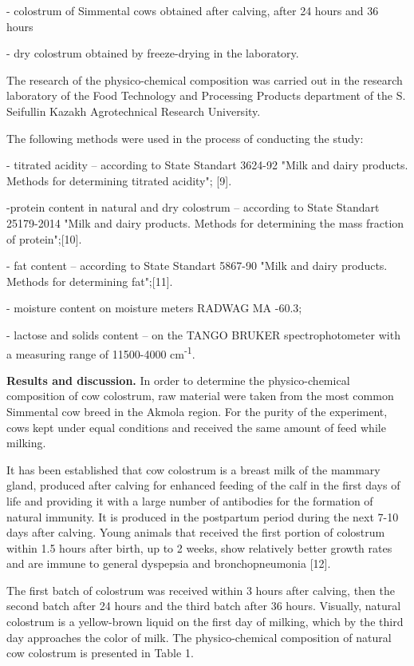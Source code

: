 - colostrum of Simmental cows obtained after calving, after 24 hours and
36 hours

- dry colostrum obtained by freeze-drying in the laboratory.

The research of the physico-chemical composition was carried out in the
research laboratory of the Food Technology and Processing Products
department of the S. Seifullin Kazakh Agrotechnical Research University.

The following methods were used in the process of conducting the study:

- titrated acidity -- according to State Standart 3624-92 "Milk and
dairy products. Methods for determining titrated acidity"; {[}9{]}.

-protein content in natural and dry colostrum -- according to State
Standart 25179-2014 "Milk and dairy products. Methods for determining
the mass fraction of protein";{[}10{]}.

- fat content -- according to State Standart 5867-90 "Milk and dairy
products. Methods for determining fat";{[}11{]}.

- moisture content on moisture meters RADWAG MA -60.3;

- lactose and solids content -- on the TANGO BRUKER spectrophotometer
with a measuring range of 11500-4000 cm\textsuperscript{-1}.

{\bfseries Results and discussion.} In order to determine the
physico-chemical composition of cow colostrum, raw material were taken
from the most common Simmental cow breed in the Akmola region. For the
purity of the experiment, cows kept under equal conditions and received
the same amount of feed while milking.

It has been established that cow colostrum is a breast milk of the
mammary gland, produced after calving for enhanced feeding of the calf
in the first days of life and providing it with a large number of
antibodies for the formation of natural immunity. It is produced in the
postpartum period during the next 7-10 days after calving. Young animals
that received the first portion of colostrum within 1.5 hours after
birth, up to 2 weeks, show relatively better growth rates and are immune
to general dyspepsia and bronchopneumonia {[}12{]}.

The first batch of colostrum was received within 3 hours after calving,
then the second batch after 24 hours and the third batch after 36 hours.
Visually, natural colostrum is a yellow-brown liquid on the first day of
milking, which by the third day approaches the color of milk. The
physico-chemical composition of natural cow colostrum is presented in
Table 1.

